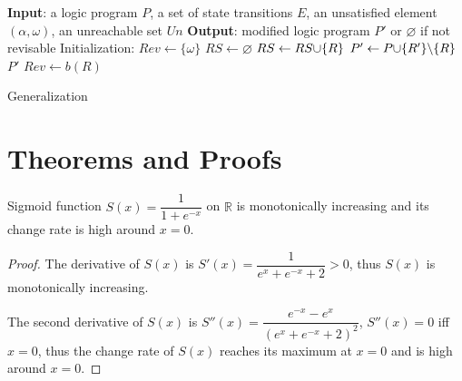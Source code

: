 \begin{algorithm}[ht]
\begin{algorithmic}
    \State \textbf{Input}: a logic program $P$, a set of state transitions $E$, an unsatisfied element $(\alpha,\omega)$, an unreachable set $Un$
    \State \textbf{Output}: modified logic program $P'$ or $\varnothing$ if not revisable
    \State Initialization: $Rev\gets\{\omega\}$
    \Do
    \State $RS\gets \varnothing$
            \State $RS\gets RS\addset{R}$
        \EndIf
    \EndFor
            \State $P'\gets P\addset{R'}\miset{R}$
                    \State\Return $P'$
                \EndIf
            \EndIf
        \EndFor
    \EndFor
        \State $Rev\gets b(R)$
    \EndFor
\end{algorithmic}
\caption{Generalization}\label{alg:generalization}
\end{algorithm}

\chapter{Theorems and Proofs}\label{sec:proof}
\begin{theorem}
    Sigmoid function $S(x)={\dfrac {1}{1+e^{-x}}}$ on $\mathbb{R}$ is monotonically increasing and its change rate is high around $x=0$.
    \begin{proof}
    The derivative of $S(x)$ is $S'(x)=\dfrac{1}{e^x+e^{-x}+2}>0$, thus $S(x)$ is monotonically increasing.
    
    The second derivative of $S(x)$ is $S''(x)=\dfrac{e^{-x}-e^x}{(e^x+e^{-x}+2)^2}$, $S''(x)=0$ iff $x=0$, thus the change rate of $S(x)$ reaches its maximum at $x=0$ and is high around $x=0$.
    \end{proof}
\end{theorem}

